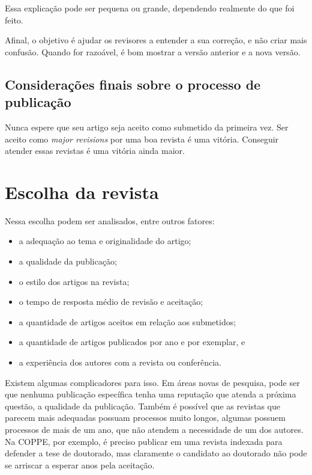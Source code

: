 \documentclass[openany]{book}
\begin{document}
 Essa explicação pode ser pequena ou grande, dependendo realmente do que foi feito.

 Afinal, o objetivo é ajudar os revisores a entender a sua correção, e não criar mais confusão.  Quando for razoável, é bom mostrar a versão anterior e a nova versão.



\section{Considerações finais sobre o processo de publicação}

Nunca espere que seu artigo seja aceito como submetido da primeira vez. Ser aceito como \textit{major revisions} por uma boa revista é uma vitória. Conseguir atender essas revistas é uma vitória ainda maior.



\chapter{Escolha da revista}

 Nessa escolha podem ser analisados, entre outros fatores:
\begin{itemize}
    \item a adequação ao tema e originalidade do artigo;
    \item a qualidade da publicação;
    \item o estilo dos artigos na revista;
    \item o tempo de resposta médio de revisão e aceitação;
    \item a quantidade de artigos aceitos em relação aos submetidos;
    \item a quantidade de artigos publicados por ano e por exemplar, e
    \item a experiência dos autores com a revista ou conferência.
\end{itemize}

 Existem algumas complicadores para isso. Em áreas novas de pesquisa, pode ser que nenhuma publicação específica tenha uma reputação que atenda a próxima questão, a qualidade da publicação. Também é possível que as revistas que parecem mais adequadas possuam processos muito longos, algumas possuem processos de mais de um ano, que não atendem a necessidade de um dos autores. Na COPPE, por exemplo, é preciso publicar em uma revista indexada para defender a tese de doutorado, mas claramente o candidato ao doutorado não pode se arriscar a esperar anos pela aceitação.
\end{document}
